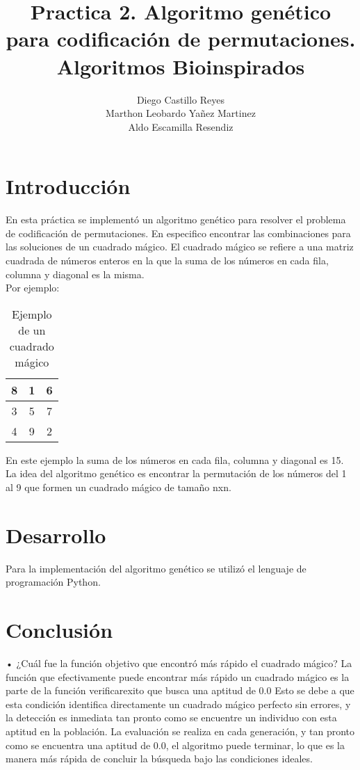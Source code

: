 \documentclass{report}
\title{\Huge{\textbf{Practica 2. Algoritmo genético para codificación de permutaciones.}}\\
\Large{\textbf{Algoritmos Bioinspirados}}}
\author{Diego Castillo Reyes\\Marthon Leobardo Yañez Martinez\\Aldo Escamilla Resendiz}
\begin{document}
    \maketitle
    \tableofcontents
    \newpage

    \section{Introducción}
    En esta práctica se implementó un algoritmo genético para resolver el problema de codificación de 
    permutaciones. En especifico encontrar las combinaciones para las soluciones de un cuadrado mágico.
    El cuadrado mágico se refiere a una matriz cuadrada de números enteros en la que la suma de los números 
    en cada fila, columna y diagonal es la misma.\\

    Por ejemplo: 
    \begin{table}[H]
        \centering
        \begin{tabular}{|c|c|c|}
            \hline
            8 & 1 & 6\\
            \hline
            3 & 5 & 7\\
            \hline
            4 & 9 & 2\\
            \hline
        \end{tabular}
        \caption{Ejemplo de un cuadrado mágico}
    \end{table}
    En este ejemplo la suma de los números en cada fila, columna y diagonal es 15.\\
    La idea del algoritmo genético es encontrar la permutación de los números del 
    1 al 9 que formen un cuadrado mágico de tamaño nxn.\\

    \section{Desarrollo}
    Para la implementación del algoritmo genético se utilizó el lenguaje de programación Python.
    
    \section{Conclusión}
    •  ¿Cuál fue la función objetivo que encontró más rápido el cuadrado mágico?
    La función que efectivamente puede encontrar más rápido un cuadrado mágico es la parte 
    de la función verificarexito que busca una aptitud de 0.0
    Esto se debe a que esta condición identifica directamente un cuadrado mágico perfecto sin errores, y la detección es inmediata 
    tan pronto como se encuentre un individuo con esta aptitud en la población. La evaluación se realiza en cada generación, 
    y tan pronto como se encuentra una aptitud de 0.0, el algoritmo puede terminar, lo que es la manera más rápida de concluir 
    la búsqueda bajo las condiciones ideales.
\end{document}
